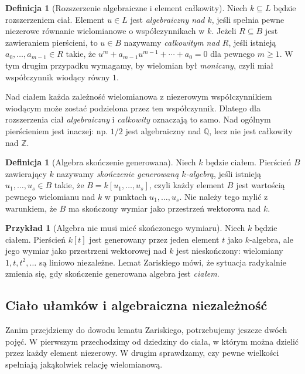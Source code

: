 \documentclass[11pt,a4paper,openany]{report}
\numberwithin{equation}{section}
\theoremstyle{plain}
\theoremstyle{definition}
\newtheorem{definicja}[twierdzenie]{Definicja}
\newtheorem{przyklad}[twierdzenie]{Przykład}
\theoremstyle{remark}
\newcommand{\Z}{\mathbb Z}
\newcommand{\Q}{\mathbb Q}
\begin{document}
\begin{definicja}[Rozszerzenie algebraiczne i element całkowity]
Niech $k\subseteq L$ będzie rozszerzeniem ciał. Element $u\in L$
jest \emph{algebraiczny nad $k$}, jeśli spełnia pewne niezerowe
równanie wielomianowe o współczynnikach w $k$.
Jeżeli $R\subseteq B$ jest zawieraniem pierścieni, to $u\in B$
nazywamy \emph{całkowitym nad $R$}, jeśli istnieją
$a_0,\dots,a_{m-1}\in R$ takie, że
$u^m+a_{m-1}u^{m-1}+\cdots+a_0=0$ dla pewnego $m\ge1$.
W tym drugim przypadku wymagamy, by wielomian był \emph{moniczny},
czyli miał współczynnik wiodący równy $1$.
\end{definicja}

Nad ciałem każda zależność wielomianowa z niezerowym
współczynnikiem wiodącym może zostać podzielona przez ten współczynnik.
Dlatego dla rozszerzenia ciał \emph{algebraiczny} i
\emph{całkowity} oznaczają to samo. Nad ogólnym pierścieniem jest
inaczej: np. $1/2$ jest algebraiczny nad $\Q$, lecz nie jest
całkowity nad $\Z$.

\begin{definicja}[Algebra skończenie generowana]
Niech $k$ będzie ciałem. Pierścień $B$ zawierający $k$
nazywamy \emph{skończenie generowaną $k$-algebrą}, jeśli
istnieją $u_1,\dots,u_s\in B$ takie, że
$B=k[u_1,\dots,u_s]$, czyli każdy element $B$ jest
wartością pewnego wielomianu nad $k$ w punktach $u_1,\dots,u_s$.
Nie należy tego mylić z warunkiem, że $B$ ma skończony wymiar
jako przestrzeń wektorowa nad $k$.
\end{definicja}

\begin{przyklad}[Algebra nie musi mieć skończonego wymiaru]
Niech $k$ będzie ciałem. Pierścień $k[t]$ jest generowany przez jeden element $t$
jako $k$-algebra, ale jego wymiar jako przestrzeni wektorowej
nad $k$ jest nieskończony: wielomiany $1,t,t^2,\dots$
są liniowo niezależne. Lemat Zariskiego mówi, że sytuacja
radykalnie zmienia się, gdy skończenie generowana algebra
jest \emph{ciałem}.
\end{przyklad}

\subsection{Ciało ułamków i algebraiczna niezależność}

Zanim przejdziemy do dowodu lematu Zariskiego, potrzebujemy jeszcze
dwóch pojęć. W pierwszym przechodzimy od dziedziny do ciała,
w którym można dzielić przez każdy element niezerowy.
W drugim sprawdzamy, czy pewne wielkości spełniają jakąkolwiek
relację wielomianową.
\end{document}
